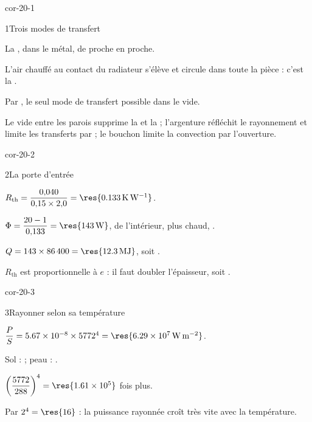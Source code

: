 \corrigesSouples

\begin{blocLivre}{cor-20-1}
\begin{corrige}{1}{Trois modes de transfert}
\begin{questions}
\item La , dans le métal, de proche en proche.
\item L'air chauffé au contact du radiateur s'élève et circule dans toute la pièce : c'est la .
\item Par , le seul mode de transfert possible dans le vide.
\item Le vide entre les parois supprime la  et la  ; l'argenture réfléchit le
rayonnement et limite les transferts par  ; le bouchon limite la convection par l'ouverture.
\end{questions}
\end{corrige}
\end{blocLivre}
\begin{blocLivre}{cor-20-2}
\begin{corrige}{2}{La porte d'entrée}
\begin{questions}
\item $R_\mathrm{th}=\dfrac{0{,}040}{0{,}15\times2{,}0}=\res{\qty{0,133}{K.W^{-1}}}$.
\item $\Phi=\dfrac{20-1}{0{,}133}=\res{\qty{143}{W}}$, de l'intérieur, plus chaud, .
\item $Q=143\times86\,400=\res{\qty{12,3}{MJ}}$, soit .
\item $R_\mathrm{th}$ est proportionnelle à $e$ : il faut doubler l'épaisseur, soit .
\end{questions}
\end{corrige}
\end{blocLivre}
\begin{blocLivre}{cor-20-3}
\begin{corrige}{3}{Rayonner selon sa température}
\begin{questions}
\item $\dfrac{P}{S}=\num{5.67e-8}\times5772^4=\res{\qty{6,29e7}{W.m^{-2}}}$.
\item Sol :  ; peau : .
\item $\left(\dfrac{5772}{288}\right)^4=\res{\num{1.61e5}}$ fois plus.
\item Par $2^4=\res{16}$ : la puissance rayonnée croît très vite avec la température.
\end{questions}
\end{corrige}
\end{blocLivre}
